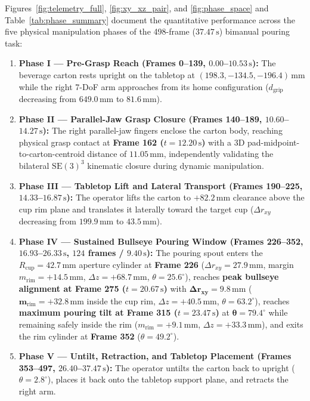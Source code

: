 \documentclass[10pt,journal]{IEEEtran}
\begin{document}
Figures~\ref{fig:telemetry_full}, \ref{fig:xy_xz_pair}, and \ref{fig:phase_space} and Table~\ref{tab:phase_summary} document the quantitative performance across the five physical manipulation phases of the 498-frame ($37.47\,\mathrm{s}$) bimanual pouring task:
\begin{enumerate}
    \item \textbf{Phase I --- Pre-Grasp Reach (Frames 0--139, $0.00$--$10.53\,\mathrm{s}$):} The beverage carton rests upright on the tabletop at $(198.3, -134.5, -196.4)\,\mathrm{mm}$ while the right 7-DoF arm approaches from its home configuration ($d_{\mathrm{grip}}$ decreasing from $649.0\,\mathrm{mm}$ to $81.6\,\mathrm{mm}$).
    \item \textbf{Phase II --- Parallel-Jaw Grasp Closure (Frames 140--189, $10.60$--$14.27\,\mathrm{s}$):} The right parallel-jaw fingers enclose the carton body, reaching physical grasp contact at \textbf{Frame 162 ($t = 12.20\,\mathrm{s}$)} with a 3D pad-midpoint-to-carton-centroid distance of $\mathbf{11.05\,\mathrm{mm}}$, independently validating the bilateral $\mathrm{SE}(3)^3$ kinematic closure during dynamic manipulation.
    \item \textbf{Phase III --- Tabletop Lift and Lateral Transport (Frames 190--225, $14.33$--$16.87\,\mathrm{s}$):} The operator lifts the carton to $+82.2\,\mathrm{mm}$ clearance above the cup rim plane and translates it laterally toward the target cup ($\Delta r_{xy}$ decreasing from $199.9\,\mathrm{mm}$ to $43.5\,\mathrm{mm}$).
    \item \textbf{Phase IV --- Sustained Bullseye Pouring Window (Frames 226--352, $16.93$--$26.33\,\mathrm{s}$, $124$ frames / $9.40\,\mathrm{s}$):} The pouring spout enters the $R_{\mathrm{cup}} = 42.7\,\mathrm{mm}$ aperture cylinder at \textbf{Frame 226} ($\Delta r_{xy} = 27.9\,\mathrm{mm}$, margin $m_{\mathrm{rim}} = +14.5\,\mathrm{mm}$, $\Delta z = +68.7\,\mathrm{mm}$, $\theta = 25.6^\circ$), reaches \textbf{peak bullseye alignment at Frame 275 ($t = 20.67\,\mathrm{s}$)} with $\mathbf{\Delta r_{xy} = 9.8\,\mathrm{mm}}$ ($\mathbf{m_{\mathrm{rim}} = +32.8\,\mathrm{mm}}$ inside the cup rim, $\Delta z = +40.5\,\mathrm{mm}$, $\theta = 63.2^\circ$), reaches \textbf{maximum pouring tilt at Frame 315 ($t = 23.47\,\mathrm{s}$)} at $\mathbf{\theta = 79.4^\circ}$ while remaining safely inside the rim ($m_{\mathrm{rim}} = +9.1\,\mathrm{mm}$, $\Delta z = +33.3\,\mathrm{mm}$), and exits the rim cylinder at \textbf{Frame 352} ($\theta = 49.2^\circ$).
    \item \textbf{Phase V --- Untilt, Retraction, and Tabletop Placement (Frames 353--497, $26.40$--$37.47\,\mathrm{s}$):} The operator untilts the carton back to upright ($\theta = 2.8^\circ$), places it back onto the tabletop support plane, and retracts the right arm.
\end{enumerate}
\end{document}

